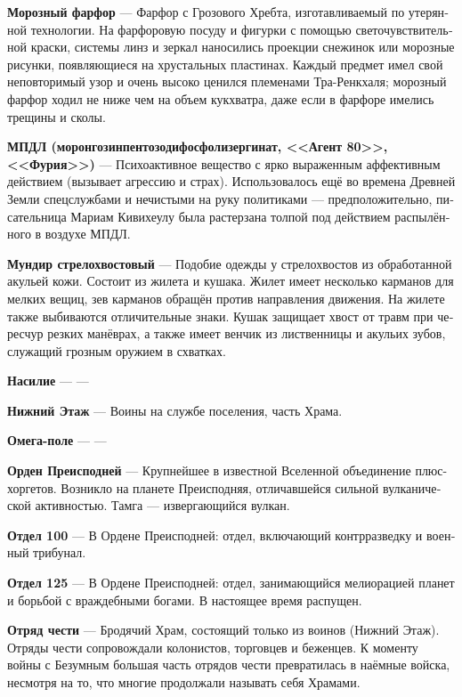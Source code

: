 \documentclass[a4paper,12pt,fleqn]{book}\usepackage{cooltooltips}\usepackage{polyglossia}\setdefaultlanguage[babelshorthands=true]{russian}\setotherlanguage{english}\defaultfontfeatures{Ligatures=TeX,Mapping=tex-text} \usepackage{xcolor}\definecolor{lightgray}{HTML}{bbbbbb}\color{lightgray}\newcommand{\ml}[3]{\textenglish{\textcolor{black}{#3}}}
\newcommand{\theterm}[3]{\textbf{\hypertarget{#1}{#2}} --- #3}
\begin{document}
{\theterm{frost-porcelain}
{Морозный фарфор}
{Фарфор с Грозового Хребта, изготавливаемый по утерянной технологии.
На фарфоровую посуду и фигурки с помощью светочувствительной краски, системы линз и зеркал наносились проекции снежинок или морозные рисунки, появляющиеся на хрустальных пластинах.
Каждый предмет имел свой неповторимый узор и очень высоко ценился племенами Тра-Ренкхаля;
морозный фарфор ходил не ниже чем на объем кукхватра, даже если в фарфоре имелись трещины и сколы.}

\theterm{mpdl}
{МПДЛ (моронгозинпентозодифосфолизергинат, <<Агент 80>>, <<Фурия>>)}
{Психоактивное вещество с ярко выраженным аффективным действием (вызывает агрессию и страх).
Использовалось ещё во времена Древней Земли спецслужбами и нечистыми на руку политиками --- предположительно, писательница Мариам Кивихеулу была растерзана толпой под действием распылённого в воздухе МПДЛ.}

\theterm{arrowtail-dress} %
{Мундир стрелохвостовый}
{Подобие одежды у стрелохвостов из обработанной акульей кожи.
Состоит из жилета и кушака.
Жилет имеет несколько карманов для мелких вещиц, зев карманов обращён против направления движения.
На жилете также выбиваются отличительные знаки.
Кушак защищает хвост от травм при чересчур резких манёврах, а также имеет венчик из лиственницы и акульих зубов, служащий грозным оружием в схватках.}

\theterm{violation} %
{Насилие}
{---}

\theterm{downstairs} %
{Нижний Этаж}
{Воины на службе поселения, часть Храма.}

\theterm{omega-field}
{Омега-поле}
{---}

\theterm
{order-of-netherworld}
{Орден Преисподней} %
{Крупнейшее в известной Вселенной объединение плюс-хоргетов.
Возникло на планете Преисподняя, отличавшейся сильной вулканической активностью.
Тамга --- извергающийся вулкан.}

\theterm{unit-100}
{Отдел 100}
{В Ордене Преисподней: отдел, включающий контрразведку и военный трибунал.}

\theterm{unit-125}
{Отдел 125}
{В Ордене Преисподней: отдел, занимающийся мелиорацией планет и борьбой с враждебными богами.
В настоящее время распущен.}

\theterm{squad-of-honor}
{Отряд чести}
{Бродячий Храм, состоящий только из воинов (Нижний Этаж).
Отряды чести сопровождали колонистов, торговцев и беженцев.
К моменту войны с Безумным большая часть отрядов чести превратилась в наёмные войска, несмотря на то, что многие продолжали называть себя Храмами.}

}
\end{document}
